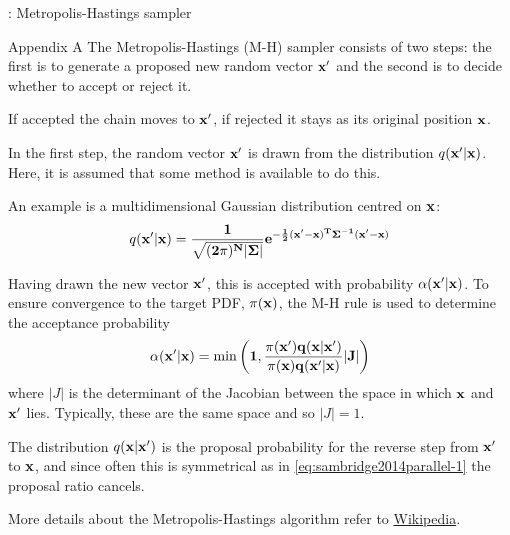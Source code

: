 

\begin{frame}{\titleprefix: Metropolis-Hastings sampler}

  \tiny
  \begin{block}{Appendix A}
    The Metropolis-Hastings (M-H) sampler consists of two steps:
    the first is to generate a proposed new random vector $\bf x'$
    and the second is to decide whether to accept or reject it.

    If accepted the chain moves to $\bf x'$,
    if rejected it stays as its original position $\bf x$.

    In the first step, the random vector $\bf x'$ is drawn from
    the distribution $q(\bf x' | \bf x)$.
    Here, it is assumed that some method is available to do this.

    An example is a multidimensional Gaussian distribution centred on $\bf x$:
    \begin{equation}\label{eq:sambridge2014parallel-1}
      q(\bf x' | \bf x) = \frac{1}{ \sqrt{(2\pi)^N | \Sigma |} }
        e^{ - \frac{1}{2} (\bf x' - \bf x)^T \Sigma^{-1} (\bf x' - \bf x) }
    \end{equation}

    Having drawn the new vector $\bf x'$,
    this is accepted with probability $\alpha(\bf x' | \bf x)$.
    To ensure convergence to the target PDF, $\pi(\bf x)$,
    the M-H rule is used to determine the acceptance probability
    \[ \alpha(\bf x' | \bf x) = \min\left( 1,
      \frac{ \pi(\bf x') q(\bf x | \bf x') }{ \pi(\bf x) q(\bf x' | \bf x) }
      |J| \right) \]
    where $|J|$ is the determinant of the Jacobian
    between the space in which $\bf x$ and $\bf x'$ lies.
    Typically, these are the same space and so $|J| = 1$.

    The distribution $q(\bf x | \bf x')$ is the proposal probability
    for the reverse step from $\bf x'$ to $\bf x$,
    and since often this is symmetrical as in \eqref{eq:sambridge2014parallel-1}
    the proposal ratio cancels.

  \end{block}

  More details about the Metropolis-Hastings algorithm refer to
  \href{https://en.wikipedia.org/wiki/%
  Metropolis-Hastings_algorithm\#Formal_derivation}{Wikipedia}.

\end{frame}
